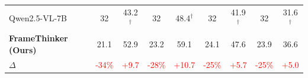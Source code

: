 \begin{table}[t]
{\begin{tabular}{lcccccccc}
                        \midrule
            Qwen2.5-VL-7B~\citep{QwenVL} & 32 & 43.2$^{\dagger}$ & 32 & 48.4$^{\dagger}$ & 32 & 41.9$^{\dagger}$ & 32 & 31.6$^{\dagger}$ \\
            \rowcolor{ourblue}\textbf{FrameThinker (Ours)} & 21.1 & 52.9 & 23.2 & 59.1 & 24.1 & 47.6 & 23.9 & 36.6 \\
                        $\Delta$ & \textcolor{red}{-34\%} & \textcolor{red}{+9.7} & \textcolor{red}{-28\%} & \textcolor{red}{+10.7} & \textcolor{red}{-25\%} & \textcolor{red}{+5.7} & \textcolor{red}{-25\%} & \textcolor{red}{+5.0} \\
            \bottomrule
        \end{tabular}
    }
\end{table}

